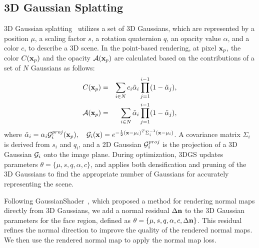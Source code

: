 \subsection{3D Gaussian Splatting}
3D Gaussian splatting~\cite{kerbl20233d} utilizes a set of 3D Gaussians, which are represented by a position $\mu$, a scaling factor $s$, a rotation quaternion $q$, an opacity value $\alpha$, and a color $c$, to describe a 3D scene. In the point-based rendering, at pixel $\mathbf{x}_p$, the color $C(\mathbf{x}_p)$ and the opacity $\mathcal{A}(\mathbf{x}_p)$ are calculated based on the contributions of a set of 
$N$ Gaussians as follows:
\begin{eqnarray}
    C(\mathbf{x}_p) &=& \sum_{i \in N} c_i \tilde{\alpha}_i \prod^{i-1}_{j=1} (1-\tilde{\alpha}_j),\label{eq:gaussian rendering1}\\
    \mathcal{A}(\mathbf{x}_p) &=& \sum_{i \in N} \tilde{\alpha}_i \prod^{i-1}_{j=1} (1-\tilde{\alpha}_j),
    \label{eq:gaussian rendering2}
\end{eqnarray}
where $ \tilde{\alpha}_i = \alpha_i \mathcal{G}^{proj}_i(\mathbf{x}_p), \quad
\mathcal{G}_i(\mathbf{x}) = e^{-\frac{1}{2}(\mathbf{x}-\mu_i)^T\Sigma^{-1}_i(\mathbf{x}-\mu_i)}$.
A covariance matrix $\Sigma_i$ is derived from $s_i$ and $q_i$, and a 2D Gaussian $\mathcal{G}^{proj}_i$ is the projection of a 3D Gaussian $\mathcal{G}_i$ onto the image plane. During optimization, 3DGS updates parameters $\theta = \{ \mu, s, q, \alpha, c \}$, and applies both densification and pruning of the 3D Gaussians to find the appropriate number of Gaussians for accurately representing the scene.

Following GaussianShader~\cite{jiang2024gaussianshader}, which proposed a method for rendering normal maps directly from 3D Gaussians, we add a normal residual $\Delta \mathbf{n}$ to the 3D Gaussian parameters for the face region, defined as $\theta = \{ \mu, s, q, \alpha, c, \Delta \mathbf{n} \}$. This residual refines the normal direction to improve the quality of the rendered normal maps. We then use the rendered normal map to apply the normal map loss.



